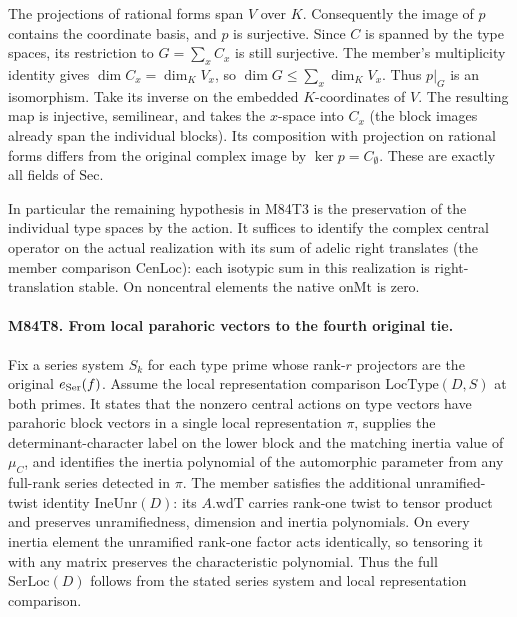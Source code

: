 The projections of rational forms span $V$ over $K$.
Consequently the image of $p$ contains the coordinate
basis, and $p$ is surjective. Since $C$ is spanned by the
type spaces, its restriction to $G=\sum_x C_x$ is still
surjective. The member's multiplicity identity gives
$\dim C_x=\dim_K V_x$, so $\dim G\le\sum_x\dim_K V_x$.
Thus $p|_G$ is an isomorphism. Take its inverse on the
embedded $K$-coordinates of $V$. The resulting map is
injective, semilinear, and takes the $x$-space into $C_x$
(the block images already span the individual blocks).
Its composition with projection on rational forms differs
from the original complex image by $\ker p=C_\emptyset$.
These are exactly all fields of $\mathrm{Sec}$.

In particular the remaining hypothesis in M84T3 is the
preservation of the individual type spaces by the action.
It suffices to identify the complex central operator on the
actual realization with its sum of adelic right translates
(the member comparison $\mathrm{CenLoc}$): each isotypic
sum in this realization is right-translation stable. On
noncentral elements the native $\mathrm{onMt}$ is zero.

\paragraph{M84T8. From local parahoric vectors to the fourth original tie.}
Fix a series system $S_k$ for each type prime whose rank-$r$
projectors are the original $e_{\rm Ser}(f)$. Assume the
local representation comparison $\mathrm{LocType}(D,S)$
at both primes. It states that the nonzero central actions
on type vectors have parahoric block vectors in a single
local representation $\pi$, supplies the determinant-character
label on the lower block and the matching inertia value of
$\mu_C$, and identifies the inertia polynomial of the
automorphic parameter from any full-rank series detected in
$\pi$. The member satisfies the additional unramified-twist
identity $\mathrm{IneUnr}(D)$: its $A.\mathrm{wdT}$ carries
rank-one twist to tensor product and preserves unramifiedness,
dimension and inertia polynomials. On every inertia element
the unramified rank-one factor acts identically, so tensoring
it with any matrix preserves the characteristic polynomial.
Thus the full $\mathrm{SerLoc}(D)$ follows from the stated
series system and local representation comparison.

